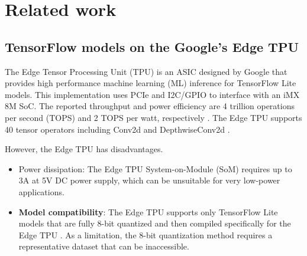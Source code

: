 \section{Related work}
\label{sec:related_work}
\subsection{TensorFlow models on the Google's Edge TPU}

The Edge Tensor Processing Unit (TPU) is an ASIC designed by Google that provides high performance machine learning (ML) inference for TensorFlow Lite models\cite{yazdanbakhsh2021evaluation}. This implementation uses PCIe and I2C/GPIO to interface with an iMX 8M SoC. The reported throughput and power efficiency are 4 trillion operations per second (TOPS) and 2 TOPS per watt, respectively \cite{coral2021Datasheet}. The Edge TPU supports 40 tensor operators including Conv2d and DepthwiseConv2d \cite{coral2021Compatibility}.

However, the Edge TPU has disadvantages.
\begin{itemize}
	\item Power dissipation: The Edge TPU System-on-Module (SoM) requires up to 3A at 5V DC power supply\cite{coral2021Datasheet}, which can be unsuitable for very low-power applications.
	\item \textbf{Model compatibility}: The Edge TPU supports only TensorFlow Lite models that are fully 8-bit quantized and then compiled specifically for the Edge TPU \cite{cass2019taking}. As a limitation, the 8-bit quantization method requires a representative dataset that can be inaccessible.
\end{itemize}